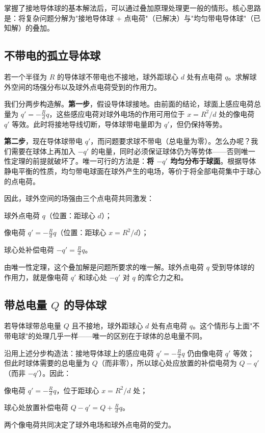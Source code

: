 掌握了接地导体球的基本解法后，可以通过叠加原理处理更一般的情形。核心思路是：将复杂问题分解为"接地导体球 + 点电荷"（已解决）与"均匀带电导体球"（已知解）的叠加。

\subsection{不带电的孤立导体球}

若一个半径为 $R$ 的导体球不带电也不接地，球外距球心 $d$ 处有点电荷 $q$。求解球外空间的场强分布以及球外点电荷受到的作用力。

我们分两步构造解。\textbf{第一步}，假设导体球接地。由前面的结论，球面上感应电荷总量为 $q' = -\frac{R}{d}q$，这些感应电荷对球外电场的作用可用位于 $x = R^2/d$ 处的像电荷 $q'$ 等效。此时将接地导线切断，导体球带电量即为 $q'$，但仍保持等势。

\textbf{第二步}，现在导体球带电 $q'$，而问题要求球不带电（总电量为零）。怎么办呢？我们需要在球体上再加入 $-q'$ 的电量，同时必须保证球体仍为等势体——否则唯一性定理的前提就破坏了。唯一可行的方法是：\textbf{将 $-q'$ 均匀分布于球面}。根据导体静电平衡的性质，均匀带电球面在球外产生的电场，等价于将全部电荷集中于球心的点电荷。

因此，球外空间的场强由三个点电荷共同激发：
\begin{Itemize}
    \item 球外点电荷 $q$（位置：距球心 $d$）；
    \item 像电荷 $q' = -\frac{R}{d}q$（位置：距球心 $x = R^2/d$）；
    \item 球心处补偿电荷 $-q' = \frac{R}{d}q$。
\end{Itemize}

由唯一性定理，这个叠加解是问题所要求的唯一解。球外点电荷 $q$ 受到导体球的作用力，就是像电荷 $q'$ 和球心处 $-q'$ 对 $q$ 的库仑力之和。

\subsection{带总电量 $Q$ 的导体球}

若导体球带总电量 $Q$ 且不接地，球外距球心 $d$ 处有点电荷 $q$。这个情形与上面"不带电球"的处理几乎一样——唯一的区别在于球体的总电量不同。

沿用上述分步构造法：接地导体球上的感应电荷 $q' = -\frac{R}{d}q$ 仍由像电荷 $q'$ 等效；但此时球体需要的总电量为 $Q$（而非零），所以球心处应放置的补偿电荷为 $Q - q'$（而非 $-q'$）。因此：
\begin{Itemize}
    \item 像电荷 $q' = -\frac{R}{d}q$，位于距球心 $x = R^2/d$ 处；
    \item 球心处放置补偿电荷 $Q - q' = Q + \frac{R}{d}q$。
\end{Itemize}
两个像电荷共同决定了球外电场和球外点电荷的受力。

